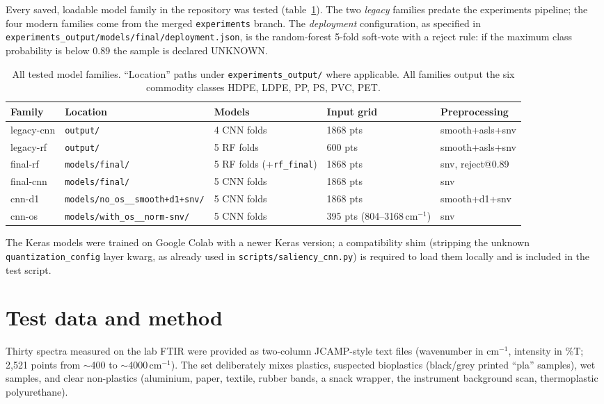 \documentclass[11pt,a4paper]{article}
\begin{document}
Every saved, loadable model family in the repository was tested
(table~\ref{tab:models}). The two \emph{legacy} families predate the
experiments pipeline; the four modern families come from the merged
\texttt{experiments} branch. The \emph{deployment} configuration, as specified
in \texttt{experiments\_output/models/final/deployment.json}, is the
random-forest 5-fold soft-vote with a reject rule: if the maximum class
probability is below 0.89 the sample is declared UNKNOWN.

\begin{table}[h]
\centering
\scriptsize
\setlength{\tabcolsep}{4pt}
\begin{tabular}{lllll}
\toprule
Family & Location & Models & Input grid & Preprocessing \\
\midrule
legacy-cnn & \texttt{output/} & 4 CNN folds & 1868 pts & smooth+asls+snv \\
legacy-rf  & \texttt{output/} & 5 RF folds  & 600 pts  & smooth+asls+snv \\
final-rf   & \texttt{models/final/} & 5 RF folds (+\texttt{rf\_final}) & 1868 pts & snv, reject@0.89 \\
final-cnn  & \texttt{models/final/} & 5 CNN folds & 1868 pts & snv \\
cnn-d1     & \texttt{models/no\_os\_\_smooth+d1+snv/} & 5 CNN folds & 1868 pts & smooth+d1+snv \\
cnn-os     & \texttt{models/with\_os\_\_norm-snv/} & 5 CNN folds & 395 pts (804--3168\,cm$^{-1}$) & snv \\
\bottomrule
\end{tabular}
\caption{All tested model families. ``Location'' paths under
\texttt{experiments\_output/} where applicable. All families output the six
commodity classes HDPE, LDPE, PP, PS, PVC, PET.}
\label{tab:models}
\end{table}

The Keras models were trained on Google Colab with a newer Keras version; a
compatibility shim (stripping the unknown \texttt{quantization\_config} layer
kwarg, as already used in \texttt{scripts/saliency\_cnn.py}) is required to
load them locally and is included in the test script.

\section{Test data and method}

Thirty spectra measured on the lab FTIR were provided as two-column
JCAMP-style text files (wavenumber in cm$^{-1}$, intensity in \%T;
2{,}521 points from $\sim$400 to $\sim$4000\,cm$^{-1}$). The set deliberately
mixes plastics, suspected bioplastics (black/grey printed ``pla'' samples),
wet samples, and clear non-plastics (aluminium, paper, textile, rubber bands,
a snack wrapper, the instrument background scan, thermoplastic polyurethane).
\end{document}
